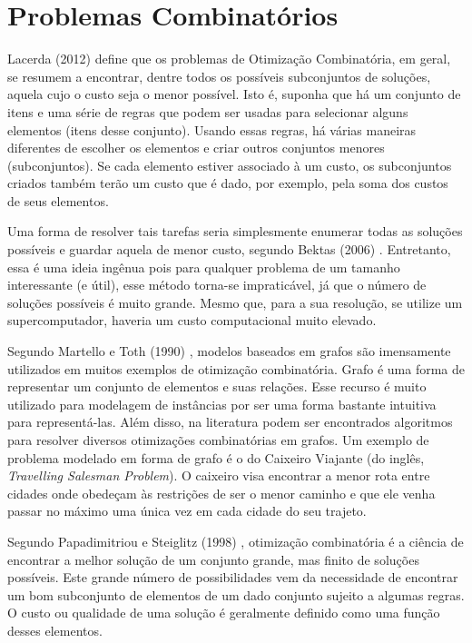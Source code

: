 \chapter{Problemas Combinatórios}



Lacerda (2012) \cite{de2012nova} define que os problemas de Otimização Combinatória, em geral, se resumem a encontrar, dentre todos os possíveis subconjuntos de soluções, aquela cujo o custo seja o menor possível. Isto é, suponha que há um conjunto de itens e uma série de regras que podem ser usadas para selecionar alguns elementos (itens desse conjunto). Usando essas regras, há várias maneiras diferentes de escolher os elementos e criar outros conjuntos menores (subconjuntos). Se cada elemento estiver associado à um custo, os subconjuntos criados também terão um custo que é dado, por exemplo, pela soma dos custos de seus elementos.

Uma forma de resolver tais tarefas seria simplesmente enumerar todas as soluções possíveis e guardar aquela de menor custo, segundo Bektas (2006) \cite{bektas2006multiple}. Entretanto, essa é uma ideia ingênua pois para qualquer problema de um tamanho interessante (e útil), esse método torna-se impraticável, já que o número de soluções possíveis é muito grande. Mesmo que, para a sua resolução, se utilize um supercomputador, haveria um custo computacional muito elevado.

Segundo Martello e Toth (1990) \cite{Martello:1990:KPA:98124}, modelos baseados em grafos são imensamente utilizados em muitos exemplos de otimização combinatória. Grafo é uma forma de representar um conjunto de elementos e suas relações. Esse recurso é muito utilizado para modelagem de instâncias por ser uma forma bastante intuitiva para representá-las. Além disso, na literatura podem ser encontrados algoritmos para resolver diversos otimizações combinatórias em grafos. Um exemplo de problema modelado em forma de grafo é o do Caixeiro Viajante (do inglês, \textit{Travelling Salesman Problem}). O caixeiro visa encontrar a menor rota entre cidades onde obedeçam às restrições de ser o menor caminho e que ele venha passar no máximo uma única vez em cada cidade do seu trajeto.

Segundo Papadimitriou e Steiglitz (1998) \cite{papadimitriou1982combinatorial}, otimização combinatória é a ciência de encontrar a melhor solução de um conjunto grande, mas finito de soluções possíveis. Este grande número de possibilidades vem da necessidade de encontrar um bom subconjunto de elementos de um dado conjunto sujeito a algumas regras. O custo ou qualidade de uma solução é geralmente definido como uma função desses elementos.

